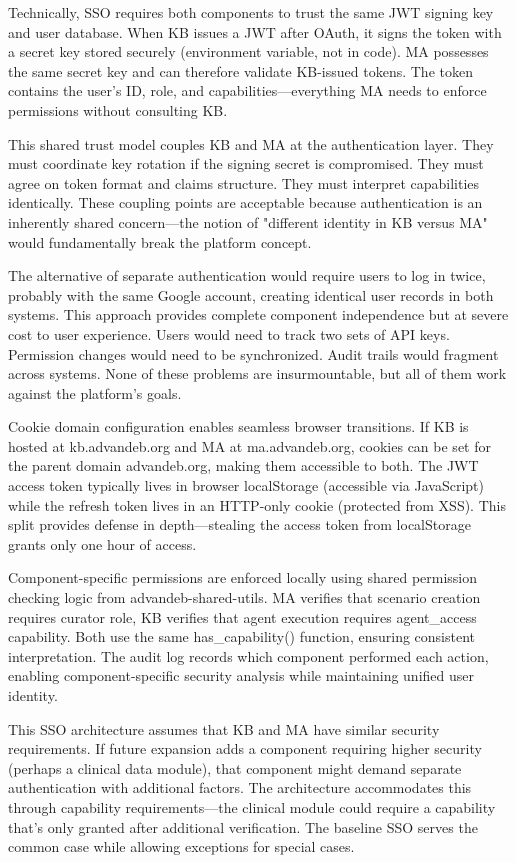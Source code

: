 \documentclass[12pt,a4paper]{article}
\begin{document}
Technically, SSO requires both components to trust the same JWT signing key and user database. When KB issues a JWT after OAuth, it signs the token with a secret key stored securely (environment variable, not in code). MA possesses the same secret key and can therefore validate KB-issued tokens. The token contains the user's ID, role, and capabilities—everything MA needs to enforce permissions without consulting KB.

This shared trust model couples KB and MA at the authentication layer. They must coordinate key rotation if the signing secret is compromised. They must agree on token format and claims structure. They must interpret capabilities identically. These coupling points are acceptable because authentication is an inherently shared concern—the notion of "different identity in KB versus MA" would fundamentally break the platform concept.

The alternative of separate authentication would require users to log in twice, probably with the same Google account, creating identical user records in both systems. This approach provides complete component independence but at severe cost to user experience. Users would need to track two sets of API keys. Permission changes would need to be synchronized. Audit trails would fragment across systems. None of these problems are insurmountable, but all of them work against the platform's goals.

Cookie domain configuration enables seamless browser transitions. If KB is hosted at kb.advandeb.org and MA at ma.advandeb.org, cookies can be set for the parent domain advandeb.org, making them accessible to both. The JWT access token typically lives in browser localStorage (accessible via JavaScript) while the refresh token lives in an HTTP-only cookie (protected from XSS). This split provides defense in depth—stealing the access token from localStorage grants only one hour of access.

Component-specific permissions are enforced locally using shared permission checking logic from advandeb-shared-utils. MA verifies that scenario creation requires curator role, KB verifies that agent execution requires agent\_access capability. Both use the same has\_capability() function, ensuring consistent interpretation. The audit log records which component performed each action, enabling component-specific security analysis while maintaining unified user identity.

This SSO architecture assumes that KB and MA have similar security requirements. If future expansion adds a component requiring higher security (perhaps a clinical data module), that component might demand separate authentication with additional factors. The architecture accommodates this through capability requirements—the clinical module could require a capability that's only granted after additional verification. The baseline SSO serves the common case while allowing exceptions for special cases.
\end{document}
